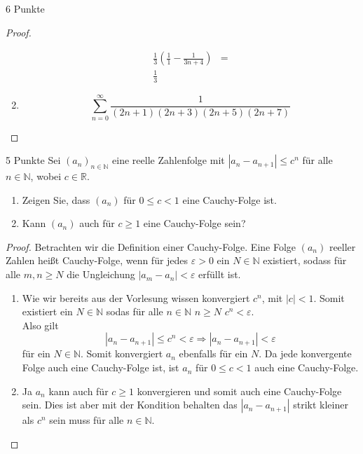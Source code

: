 \documentclass{problemset}
\begin{document}
\begin{problem}{6 Punkte}
\begin{proof}
\begin{enumerate}
\begin{align*}
                  \frac{1}{3} \left(\frac{1}{1} - \frac{1}{3n +4} \right)                                                                                                                                                                        & = \\
                  \frac{1}{3}
              \end{align*}
        \item \[
                  \sum_{n=0}^{\infty} \frac{1}{(2n+1)(2n+3)(2n+5)(2n+7)}
              \]
    \end{enumerate}
\end{proof}
\end{problem}

\begin{problem}{5 Punkte}
Sei $(a_n)_{n\in\mathbb{N}}$ eine reelle Zahlenfolge mit $|a_n - a_{n+1}| \leq c^n$ für alle $n \in \mathbb{N}$, wobei $c \in \mathbb{R}$.
\begin{enumerate}
    \item Zeigen Sie, dass $(a_n)$ für $0 \leq c < 1$ eine Cauchy-Folge ist.
    \item Kann $(a_n)$ auch für $c \geq 1$ eine Cauchy-Folge sein?
\end{enumerate}
\begin{proof}
    Betrachten wir die Definition einer Cauchy-Folge.
    Eine Folge $(a_n)$ reeller Zahlen heißt Cauchy-Folge, wenn für jedes $\varepsilon > 0$ ein $N \in \mathbb{N}$ existiert,
    sodass für alle $m, n \geq N$ die Ungleichung $|a_m - a_n| < \varepsilon$ erfüllt ist.

    \begin{enumerate}
        \item Wie wir bereits aus der Vorlesung wissen konvergiert $c^n$, mit $|c| < 1$.
              Somit existiert ein $N \in \mathbb{N}$ sodas für alle $n \in \mathbb{N}$ $n \ge N$ $c^n < \varepsilon$. \\
              Also gilt \[
                  |a_n - a_{n+1}| \leq c^n < \varepsilon \Longrightarrow |a_n - a_{n+1}| < \varepsilon
              \] für ein $N \in \mathbb{N}$. Somit konvergiert $a_n$ ebenfalls für ein $N$.
              Da jede konvergente Folge auch eine Cauchy-Folge ist, ist $a_n$ für $0 \leq c < 1$ auch eine Cauchy-Folge.
        \item Ja $a_n$ kann auch für $c \ge 1$ konvergieren und somit auch eine Cauchy-Folge sein.
              Dies ist aber mit der Kondition behalten das $|a_n - a_{n+1}|$ strikt kleiner als $c^n$ sein muss für alle $n \in \mathbb{N}$.
    \end{enumerate}
\end{proof}

\end{problem}
\end{document}
